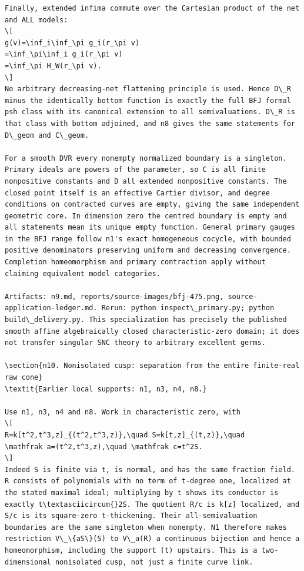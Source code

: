 \documentclass[
  11pt,
]{article}
\begin{document}
\begin{lstlisting}
Finally, extended infima commute over the Cartesian product of the net and ALL models:
\[
g(v)=\inf_i\inf_\pi g_i(r_\pi v)
=\inf_\pi\inf_i g_i(r_\pi v)
=\inf_\pi H_W(r_\pi v).
\]
No arbitrary decreasing-net flattening principle is used. Hence D\_R minus the identically bottom function is exactly the full BFJ formal psh class with its canonical extension to all semivaluations. D\_R is that class with bottom adjoined, and n8 gives the same statements for D\_geom and C\_geom.

For a smooth DVR every nonempty normalized boundary is a singleton. Primary ideals are powers of the parameter, so C is all finite nonpositive constants and D all extended nonpositive constants. The closed point itself is an effective Cartier divisor, and degree conditions on contracted curves are empty, giving the same independent geometric core. In dimension zero the centred boundary is empty and all statements mean its unique empty function. General primary gauges in the BFJ range follow n1's exact homogeneous cocycle, with bounded positive denominators preserving uniform and decreasing convergence. Completion homeomorphism and primary contraction apply without claiming equivalent model categories.

Artifacts: n9.md, reports/source-images/bfj-475.png, source-application-ledger.md. Rerun: python inspect\_primary.py; python build\_delivery.py. This specialization has precisely the published smooth affine algebraically closed characteristic-zero domain; it does not transfer singular SNC theory to arbitrary excellent germs.

\section{n10. Nonisolated cusp: separation from the entire finite-real raw cone}
\textit{Earlier local supports: n1, n3, n4, n8.}

Use n1, n3, n4 and n8. Work in characteristic zero, with
\[
R=k[t^2,t^3,z]_{(t^2,t^3,z)},\quad S=k[t,z]_{(t,z)},\quad
\mathfrak a=(t^2,t^3,z),\quad \mathfrak c=t^2S.
\]
Indeed S is finite via t, is normal, and has the same fraction field. R consists of polynomials with no term of t-degree one, localized at the stated maximal ideal; multiplying by t shows its conductor is exactly t\textasciicircum{}2S. The quotient R/c is k[z] localized, and S/c is its square-zero t-thickening. Their all-semivaluation boundaries are the same singleton when nonempty. N1 therefore makes restriction V\_\{aS\}(S) to V\_a(R) a continuous bijection and hence a homeomorphism, including the support (t) upstairs. This is a two-dimensional nonisolated cusp, not just a finite curve link.


\end{lstlisting}
\end{document}
